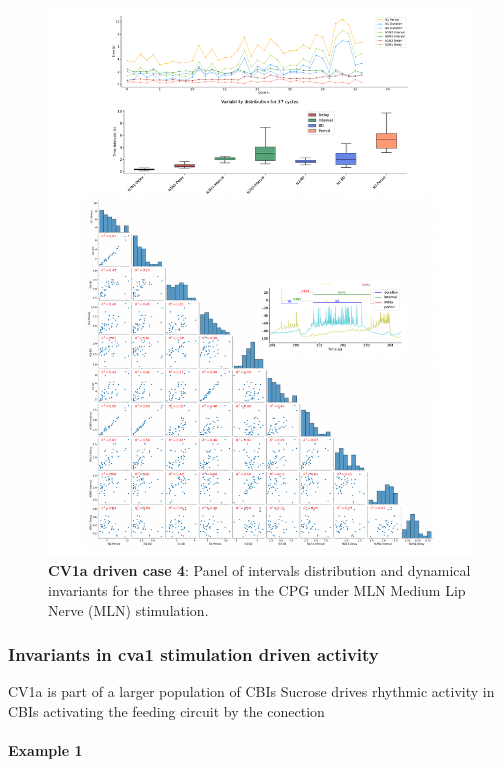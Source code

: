 \begin{figure}[htbp]
	\centering
	\includegraphics[width=1.1\textwidth]{./invariants/data/SUSSEX/MLN_driven/images/panel_with_pairplot.pdf}
	\caption{\textbf{CV1a driven case 4}: Panel of intervals distribution and dynamical invariants for the three phases in the CPG under MLN Medium Lip Nerve (MLN) stimulation.}
	\label{fig:mln stimulation pairplot}
\end{figure}

\subsubsection{Invariants in cva1 stimulation driven activity}
CV1a is part of a larger population of CBIs 
Sucrose drives rhythmic activity in CBIs activating the feeding circuit by the conection
\paragraph{\large{Example 1}}

